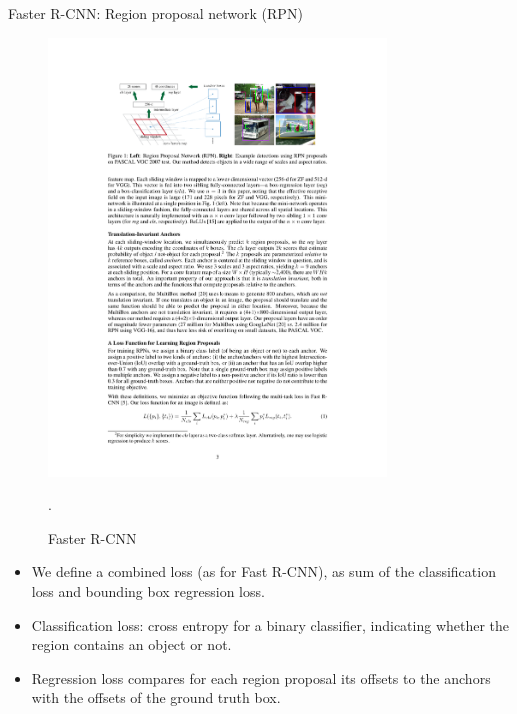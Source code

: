 \documentclass[xcolor=pdftex,dvipsnames,table]{beamer}
\begin{document}
\begin{frame}{Faster R-CNN: Region proposal network (RPN)}
\begin{figure}[htb]
   \centering
   \includegraphics[width=0.8\textwidth]{../graphics/Faster_R-CNN.pdf}
   \caption{Faster R-CNN \cite{Ren2017}}.
\end{figure}
\begin{itemize}
\item We define a combined loss (as for Fast R-CNN), as sum of the classification loss and bounding box regression loss.
\item Classification loss: cross entropy for a binary classifier, indicating whether the region contains an object or not.
\item Regression loss compares for each region proposal its offsets to the anchors with the offsets of the ground truth box.
\end{itemize}
\end{frame}
\end{document}
